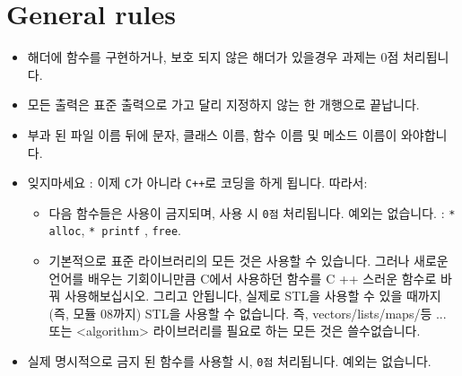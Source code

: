 
\chapter{General rules}


    \begin{itemize}

 		\item 해더에 함수를 구현하거나, 보호 되지 않은 해더가 있을경우 과제는 0점 처리됩니다.

 		\item 모든 출력은 표준 출력으로 가고 달리 지정하지 않는 한 개행으로 끝납니다.

 		\item 부과 된 파일 이름 뒤에 문자, 클래스 이름, 함수 이름 및 메소드 이름이 와야합니다.

 		\item 잊지마세요 : 이제  \texttt{C}가 아니라 \texttt{C++}로 코딩을 하게 됩니다. 따라서:
		  
		  \begin{itemize}
		  
		  \item 다음 함수들은 사용이 금지되며, 사용 시 \texttt{0점} 처리됩니다. 예외는 없습니다. : \texttt{* alloc}, \texttt{* printf} , \texttt{free}.

		  \item 기본적으로 표준 라이브러리의 모든 것은 사용할 수 있습니다. 그러나 새로운 언어를 배우는 기회이니만큼 C에서 사용하던 함수를 C ++ 스러운 함수로 바꿔 사용해보십시오. 그리고 안됩니다, 실제로 STL을 사용할 수 있을 때까지 (즉, 모듈 08까지) STL을 사용할 수 없습니다. 즉, vectors/lists/maps/등 ... 또는 <algorithm> 라이브러리를 필요로 하는 모든 것은 쓸수없습니다.

		  \end{itemize}

		\item 실제 명시적으로 금지 된 함수를  사용할 시, \texttt{0점} 처리됩니다. 예외는 없습니다.


\end{itemize}
